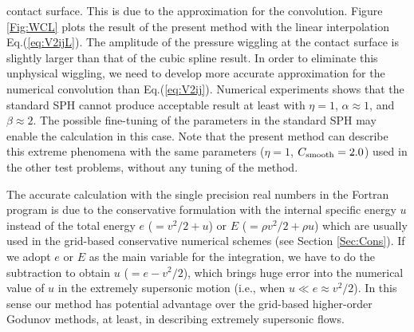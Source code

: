\documentclass{cjour}
\begin{document}
\begin{article}
contact surface.   
This is due to the approximation for the convolution. 
Figure \ref{Fig:WCL} plots the result of the present method with 
the linear interpolation Eq.(\ref{eq:V2ijL}).  
The amplitude of the pressure wiggling at the contact surface 
is slightly larger than that of the cubic spline result.  
In order to eliminate this unphysical wiggling, 
we need to develop more accurate approximation for the 
numerical convolution than Eq.(\ref{eq:V2ij}). 
Numerical experiments shows that the standard SPH cannot produce 
acceptable result at least with $\eta=1$, $\alpha \approx 1$, and 
$\beta \approx 2$.  
The possible fine-tuning of the parameters in the standard SPH 
may enable the calculation in this case.  
Note that the present method can describe this extreme phenomena 
with the same parameters ($\eta=1$, $C_{\rm smooth}=2.0$) 
used in the other test problems, 
without any tuning of the method. 

The accurate calculation with the single precision real numbers 
in the Fortran program is due to the conservative formulation  
with the internal specific energy $u$ instead of the total energy 
$e$ ($=v^2/2 + u$) or $E$ ($=\rho v^2/2 + \rho u$) which are 
usually used in the grid-based conservative numerical schemes  
(see Section \ref{Sec:Cons}).   
If we adopt $e$ or $E$ as the main variable for the integration, 
we have to do the subtraction to obtain $u$ ($=e-v^2/2$), 
which brings huge error into the numerical value of $u$ 
in the extremely supersonic motion 
(i.e., when $u \ll e \approx v^2/2$). 
In this sense our method has potential advantage 
over the grid-based higher-order Godunov methods, 
at least, in describing extremely supersonic flows. 






\end{article}
\end{document}
